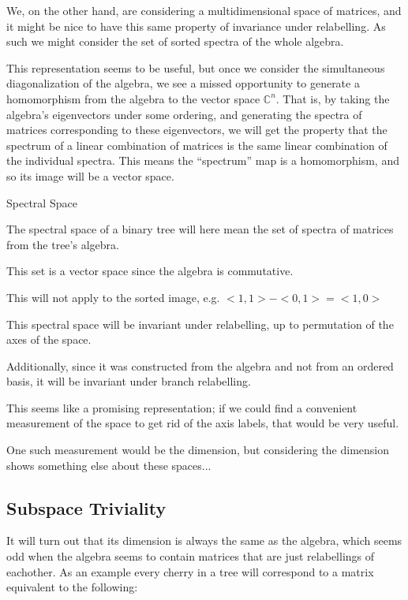 \documentclass{report}
\begin{document}
We, on the other hand, are considering a multidimensional space of matrices,
and it might be nice to have this same property of invariance under
relabelling.
As such we might consider the set of sorted spectra of the whole algebra.

This representation seems to be useful, but once we consider the simultaneous
diagonalization of the algebra, we see a missed opportunity to generate a
homomorphism from the algebra to the vector space $\mathds{C}^n$.
That is, by taking the algebra's eigenvectors under some ordering, and
generating the spectra of matrices corresponding to these eigenvectors, we will
get the property that the spectrum of a linear combination of matrices is the
same linear combination of the individual spectra.
This means the ``spectrum'' map is a homomorphism, and so its image will be a
vector space.

\begin{definition}Spectral Space

	The spectral space of a binary tree will here mean the set of spectra of matrices from the tree's algebra.

	This set is a vector space since the algebra is commutative.
\end{definition}


This will not apply to the sorted image, e.g. $<1, 1> - <0, 1> = <1, 0>$

This spectral space will be invariant under relabelling, up to permutation of the axes of the space.

Additionally, since it was constructed from the algebra and not from an ordered basis, it will be invariant under branch relabelling.

This seems like a promising representation; if we could find a convenient measurement of the space to get rid of the axis labels, that would be very useful.

One such measurement would be the dimension, but considering the dimension shows something else about these spaces...


\subsection{Subspace Triviality}

It will turn out that its dimension is always the same as the algebra, which
seems odd when the algebra seems to contain matrices that are just relabellings
of eachother.
As an example every cherry in a tree will correspond to a matrix equivalent to
the following:
\end{document}
